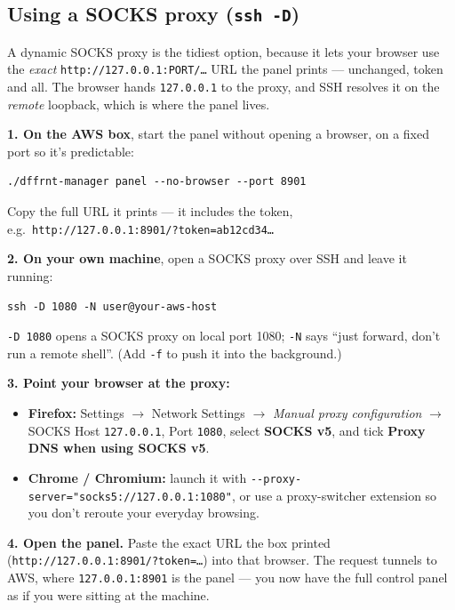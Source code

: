 \documentclass[11pt,letterpaper]{article}
\begin{document}
\subsection{Using a SOCKS proxy (\texttt{ssh -D})}

A dynamic SOCKS proxy is the tidiest option, because it lets your browser use
the \emph{exact} \texttt{http://127.0.0.1:PORT/\ldots} URL the panel prints ---
unchanged, token and all. The browser hands \texttt{127.0.0.1} to the proxy,
and SSH resolves it on the \emph{remote} loopback, which is where the panel
lives.

\textbf{1. On the AWS box}, start the panel without opening a browser, on a
fixed port so it's predictable:

\begin{lstlisting}
./dffrnt-manager panel --no-browser --port 8901
\end{lstlisting}

Copy the full URL it prints --- it includes the token, e.g.\
\texttt{http://127.0.0.1:8901/?token=ab12cd34\ldots}

\textbf{2. On your own machine}, open a SOCKS proxy over SSH and leave it
running:

\begin{lstlisting}
ssh -D 1080 -N user@your-aws-host
\end{lstlisting}

\texttt{-D 1080} opens a SOCKS proxy on local port 1080; \texttt{-N} says
``just forward, don't run a remote shell''. (Add \texttt{-f} to push it into
the background.)

\textbf{3. Point your browser at the proxy:}

\begin{itemize}
  \item \textbf{Firefox:} Settings $\rightarrow$ Network Settings $\rightarrow$
        \emph{Manual proxy configuration} $\rightarrow$ SOCKS Host
        \texttt{127.0.0.1}, Port \texttt{1080}, select \textbf{SOCKS v5}, and
        tick \textbf{Proxy DNS when using SOCKS v5}.
  \item \textbf{Chrome / Chromium:} launch it with
        \texttt{-{}-proxy-server="socks5://127.0.0.1:1080"}, or use a
        proxy-switcher extension so you don't reroute your everyday browsing.
\end{itemize}

\textbf{4. Open the panel.} Paste the exact URL the box printed
(\texttt{http://127.0.0.1:8901/?token=\ldots}) into that browser. The request
tunnels to AWS, where \texttt{127.0.0.1:8901} is the panel --- you now have the
full control panel as if you were sitting at the machine.
\end{document}
